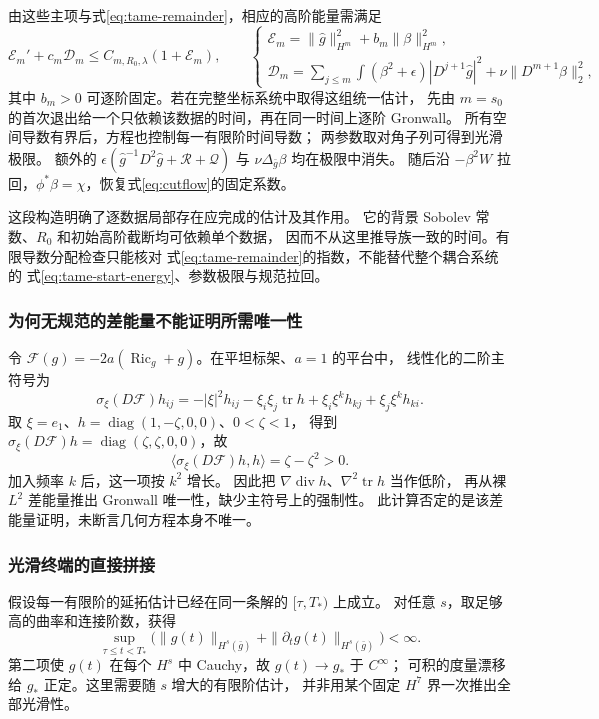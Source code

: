 \documentclass[UTF8,a4paper,11pt,fontset=fandol]{ctexart}
\numberwithin{equation}{section}
\theoremstyle{definition}
\newcommand{\Ric}{\operatorname{Ric}}
\newcommand{\tr}{\operatorname{tr}}
\begin{document}
由这些主项与式\eqref{eq:tame-remainder}，相应的高阶能量需满足
\begin{equation}\label{eq:tame-start-energy}
\mathscr E_m'+c_m\mathscr D_m
\le C_{m,R_0,\lambda}(1+\mathscr E_m),\qquad
\begin{cases}
\mathscr E_m=\|\widehat g\|_{H^m}^2+b_m\|\beta\|_{H^m}^2,\\
\mathscr D_m=\sum_{j\le m}\int(\beta^2+\epsilon)|D^{j+1}\widehat g|^2
+\nu\|D^{m+1}\beta\|_2^2,
\end{cases}
\end{equation}
其中 $b_m>0$ 可逐阶固定。若在完整坐标系统中取得这组统一估计，
先由 $m=s_0$ 的首次退出给一个只依赖该数据的时间，再在同一时间上逐阶 Gronwall。
所有空间导数有界后，方程也控制每一有限阶时间导数；
两参数取对角子列可得到光滑极限。
额外的 $\epsilon(\widehat g^{-1}D^2\widehat g+\mathscr R+\mathscr Q)$
与 $\nu\Delta_{\bar g}\beta$ 均在极限中消失。
随后沿 $-\beta^2W$ 拉回，$\phi^*\beta=\chi$，恢复式\eqref{eq:cutflow}的固定系数。

这段构造明确了逐数据局部存在应完成的估计及其作用。
它的背景 Sobolev 常数、$R_0$ 和初始高阶截断均可依赖单个数据，
因而不从这里推导族一致的时间。有限导数分配检查只能核对
式\eqref{eq:tame-remainder}的指数，不能替代整个耦合系统的
式\eqref{eq:tame-start-energy}、参数极限与规范拉回。

\subsubsection{为何无规范的差能量不能证明所需唯一性}\label{sec:ungauged-restart}
令 $\mathcal F(g)=-2a(\Ric_g+g)$。在平坦标架、$a=1$ 的平台中，
线性化的二阶主符号为
\[
\sigma_\xi(D\mathcal F)h_{ij}
=-|\xi|^2h_{ij}-\xi_i\xi_j\tr h
 +\xi_i\xi^kh_{kj}+\xi_j\xi^kh_{ki}.
\]
取 $\xi=e_1$、$h=\operatorname{diag}(1,-\zeta,0,0)$、$0<\zeta<1$，
得到 $\sigma_\xi(D\mathcal F)h=\operatorname{diag}(\zeta,\zeta,0,0)$，故
\[
\langle\sigma_\xi(D\mathcal F)h,h\rangle=\zeta-\zeta^2>0.
\]
加入频率 $k$ 后，这一项按 $k^2$ 增长。
因此把 $\nabla\operatorname{div}h$、$\nabla^2\tr h$ 当作低阶，
再从裸 $L^2$ 差能量推出 Gronwall 唯一性，缺少主符号上的强制性。
此计算否定的是该差能量证明，未断言几何方程本身不唯一。

\subsubsection{光滑终端的直接拼接}\label{sec:smooth-terminal-splice}
假设每一有限阶的延拓估计已经在同一条解的 $[\tau,T_*)$ 上成立。
对任意 $s$，取足够高的曲率和连接阶数，获得
\[
\sup_{\tau\le t<T_*}
\bigl(\|g(t)\|_{H^s(\bar g)}+\|\partial_tg(t)\|_{H^s(\bar g)}\bigr)<\infty.
\]
第二项使 $g(t)$ 在每个 $H^s$ 中 Cauchy，故 $g(t)\to g_*$ 于 $C^\infty$；
可积的度量漂移给 $g_*$ 正定。这里需要随 $s$ 增大的有限阶估计，
并非用某个固定 $H^7$ 界一次推出全部光滑性。
\end{document}
